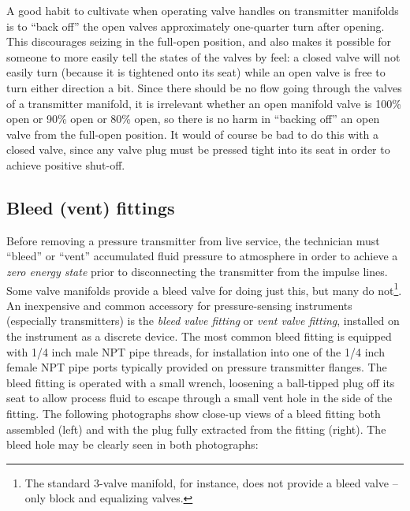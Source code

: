 A good habit to cultivate when operating valve handles on transmitter manifolds is to ``back off'' the open valves approximately one-quarter turn after opening.  This discourages seizing in the full-open position, and also makes it possible for someone to more easily tell the states of the valves by feel: a closed valve will not easily turn (because it is tightened onto its seat) while an open valve is free to turn either direction a bit.  Since there should be no flow going through the valves of a transmitter manifold, it is irrelevant whether an open manifold valve is 100\% open or 90\% open or 80\% open, so there is no harm in ``backing off'' an open valve from the full-open position.  It would of course be bad to do this with a closed valve, since any valve plug must be pressed tight into its seat in order to achieve positive shut-off.





\filbreak
\subsection{Bleed (vent) fittings}

Before removing a pressure transmitter from live service, the technician must ``bleed'' or ``vent'' accumulated fluid pressure to atmosphere in order to achieve a \textit{zero energy state} prior to disconnecting the transmitter from the impulse lines.  Some valve manifolds provide a bleed valve for doing just this, but many do not\footnote{The standard 3-valve manifold, for instance, does not provide a bleed valve -- only block and equalizing valves.}.  An inexpensive and common accessory for pressure-sensing instruments (especially transmitters) is the \textit{bleed valve fitting} or \textit{vent valve fitting}, installed on the instrument as a discrete device.  The most common bleed fitting is equipped with 1/4 inch male NPT pipe threads, for installation into one of the 1/4 inch female NPT pipe ports typically provided on pressure transmitter flanges.  The bleed fitting is operated with a small wrench, loosening a ball-tipped plug off its seat to allow process fluid to escape through a small vent hole in the side of the fitting.  The following photographs show close-up views of a bleed fitting both assembled (left) and with the plug fully extracted from the fitting (right).  The bleed hole may be clearly seen in both photographs:    

